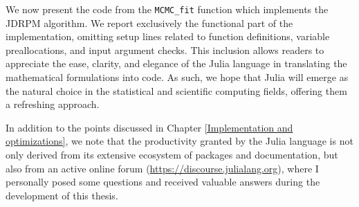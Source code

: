 \documentclass[12pt,	%
	a4paper,		%
	twoside,		%
	openright,		%
	titlepage,%
	]{book}
\theoremstyle{definition}
\newcommand{\mjline}[1]{\texttt{#1}}
\begin{document}
We now present the code from the \mjline{MCMC_fit} function which implements the JDRPM algorithm. We report exclusively the functional part of the implementation, omitting setup lines related to function definitions, variable preallocations, and input argument checks. This inclusion allows readers to appreciate the ease, clarity, and elegance of the Julia language in translating the mathematical formulations into code. As such, we hope that Julia will emerge as the natural choice in the statistical and scientific computing fields, offering them a refreshing approach.

In addition to the points discussed in Chapter \ref{Implementation and optimizations}, we note that the productivity granted by the Julia language is not only derived from its extensive ecosystem of packages and documentation, but also from an active online forum (\url{https://discourse.julialang.org}), where I personally posed some questions and received valuable answers during the development of this thesis. 

\end{document}
